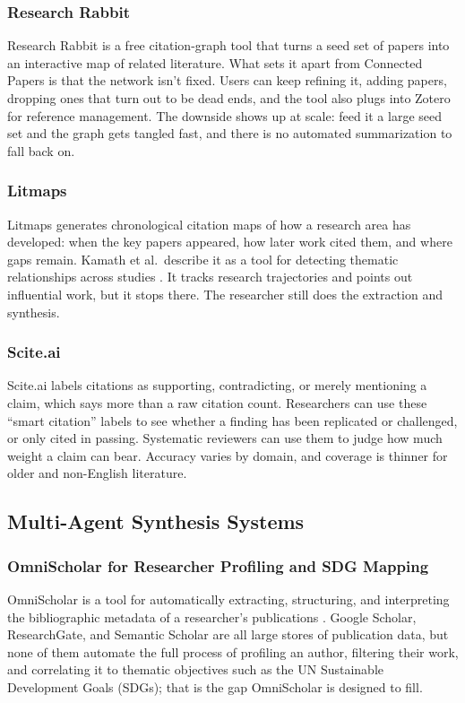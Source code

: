 \documentclass[sn-basic,Numbered]{sn-jnl}
\begin{document}
\subsubsection{Research Rabbit} Research Rabbit is a free citation-graph tool that turns a seed set of papers into an interactive map of related literature. What sets it apart from Connected Papers is that the network isn't fixed. Users can keep refining it, adding papers, dropping ones that turn out to be dead ends, and the tool also plugs into Zotero for reference management. The downside shows up at scale: feed it a large seed set and the graph gets tangled fast, and there is no automated summarization to fall back on.
\subsubsection{Litmaps} Litmaps generates chronological citation maps of how a research area has developed: when the key papers appeared, how later work cited them, and where gaps remain. Kamath et al.\ describe it as a tool for detecting thematic relationships across studies \cite{kamath2025academic}. It tracks research trajectories and points out influential work, but it stops there. The researcher still does the extraction and synthesis.
\subsubsection{Scite.ai} Scite.ai labels citations as supporting, contradicting, or merely mentioning a claim, which says more than a raw citation count. Researchers can use these ``smart citation'' labels to see whether a finding has been replicated or challenged, or only cited in passing. Systematic reviewers can use them to judge how much weight a claim can bear. Accuracy varies by domain, and coverage is thinner for older and non-English literature.

\subsection{Multi-Agent Synthesis Systems}

\subsubsection{OmniScholar for Researcher Profiling and SDG Mapping}

OmniScholar is a tool for automatically extracting, structuring, and
interpreting the bibliographic metadata of a researcher's publications
\cite{kunekar2025omnischolar}. Google Scholar, ResearchGate, and
Semantic Scholar are all large stores of publication data, but none of
them automate the full process of profiling an author, filtering their
work, and correlating it to thematic objectives such as the UN
Sustainable Development Goals (SDGs); that is the gap OmniScholar is
designed to fill.
\end{document}
